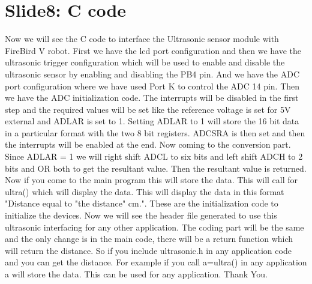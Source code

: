 \documentclass[a4paper,29.6pt]{article}
\begin{document}
\section{Slide8: C code}
\begin{small}

Now we will see the C code to interface the Ultrasonic sensor module with FireBird V robot.
First we have the lcd port configuration and then we have the ultrasonic trigger configuration which will be used to enable and disable the ultrasonic sensor by enabling and disabling the PB4 pin. And we have the ADC port configuration where we have used Port K to control the ADC 14 pin. Then we have the ADC initialization code. The interrupts will be disabled in the first step and the required values will be set like the reference voltage is set for 5V external and ADLAR is set to 1. Setting ADLAR to 1 will store the 16 bit data in a particular format with the two 8 bit registers. ADCSRA is then set and then the interrupts will be enabled at the end. Now coming to the conversion part. Since ADLAR = 1 we will right shift ADCL to six bits and left shift ADCH to 2 bits and OR both to get the resultant value. Then the resultant value is returned. Now if you come to the main program this will store the data. This will call for ultra() which will display the data. This will display the data in this format "Distance equal to "the distance" cm.". These are the initialization code to initialize the devices. 
Now we will see the header file generated to use this ultrasonic interfacing for any other application. The coding part will be the same and the only change is in the main code, there will be a return function which will return the distance. So if you include ultrasonic.h in any application code and you can get the distance. For example if you call a=ultra() in any application a will store the data. This can be used for any application. Thank You.
\end{small}
\end{document}
